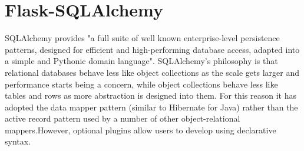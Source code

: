 \section{Flask-SQLAlchemy}
SQLAlchemy provides "a full suite of well known enterprise-level persistence patterns, designed for efficient and high-performing database access, adapted into a simple and Pythonic domain language". SQLAlchemy's philosophy is that relational databases behave less like object collections as the scale gets larger and performance starts being a concern, while object collections behave less like tables and rows as more abstraction is designed into them. For this reason it has adopted the data mapper pattern (similar to Hibernate for Java) rather than the active record pattern used by a number of other object-relational mappers.However, optional plugins allow users to develop using declarative syntax.

\thispagestyle{fancy}

